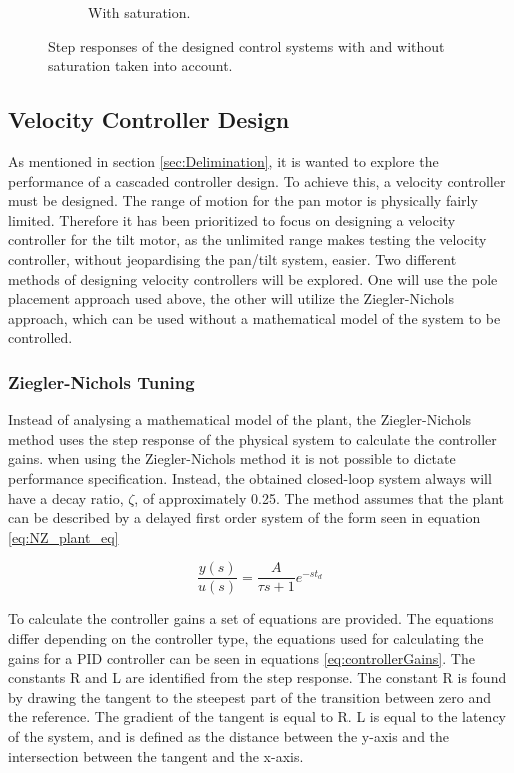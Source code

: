 \documentclass[../../main.tex]{subfiles}
\begin{document}
\begin{figure}[h]
\begin{subfigure}{0.48\textwidth}
    \caption{With saturation.}
    \label{fig:PosStepNoSat}
\end{subfigure}
\caption{Step responses of the designed control systems with and without saturation taken into account.}
\label{fig:PosStep}
\end{figure}


\subsection{Velocity Controller Design}
As mentioned in section \ref{sec:Delimination}, it is wanted to explore the performance of a cascaded controller design. To achieve this, a velocity controller must be designed. The range of motion for the pan motor is physically fairly limited. Therefore it has been prioritized to focus on designing a velocity controller for the tilt motor, as the unlimited range makes testing the velocity controller, without jeopardising the pan/tilt system, easier. Two different methods of designing velocity controllers will be explored. One will use the pole placement approach used above, the other will utilize the Ziegler-Nichols approach, which can be used without a mathematical model of the system to be controlled.

\subsubsection{Ziegler-Nichols Tuning}
Instead of analysing a mathematical model of the plant, the Ziegler-Nichols method uses the step response of the physical system to calculate the controller gains. when using the Ziegler-Nichols method it is not possible to dictate performance specification. Instead, the obtained closed-loop system always will have a decay ratio, $\zeta$, of approximately 0.25. The method assumes that the plant can be described by a delayed first order system of the form seen in equation \ref{eq:NZ_plant_eq}

\begin{equation}
    \frac{y(s)}{u(s)} = \frac{A}{\tau s + 1} e^{-s t_d}
    \label{eq:NZ_plant_eq}
\end{equation}

To calculate the controller gains a set of equations are provided. The equations differ depending on the controller type, the equations used for calculating the gains for a PID controller can be seen in equations \ref{eq:controllerGains}. The constants R and L are identified from the step response. The constant R is found by drawing the tangent to the steepest part of the transition between zero and the reference. The gradient of the tangent is equal to R. L is equal to the latency of the system, and is defined as the distance between the y-axis and the intersection between the tangent and the x-axis. 
\end{document}

